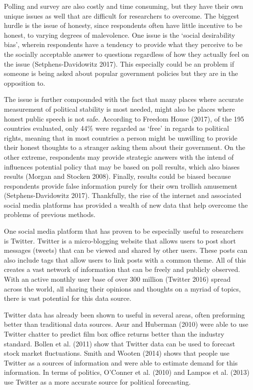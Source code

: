 \documentclass[12pt]{article}
\begin{document}
\begin{spacing}{1.5}
Polling and survey are also costly and time consuming, but they have their own unique issues as well that are difficult for researchers to overcome. The biggest hurdle is the issue of honesty, since respondents often have little incentive to be honest, to varying degrees of malevolence. One issue is the `social desirability bias', wherein respondents have a tendency to provide what they perceive to be the socially acceptable answer to questions regardless of how they actually feel on the issue (Setphens-Davidowitz 2017). This especially could be an problem if someone is being asked about popular government policies but they are in the opposition to. 

The issue is further compounded with the fact that many places where accurate measurement of political stability is most needed, might also be places where honest public speech is not safe. According to Freedom House (2017), of the 195 countries evaluated, only 44\% were regarded as `free' in regards to political rights, meaning that in most countries a person might be unwilling to provide their honest thoughts to a stranger asking them about their government. On the other extreme, respondents may provide strategic answers with the intend of influences potential policy that may be based on poll results, which also biases results (Morgan and Stocken 2008). Finally, results could be biased because respondents provide false information purely for their own trollish amusement (Setphens-Davidowitz 2017). Thankfully, the rise of the internet and associated social media platforms has provided a wealth of new data that help overcome the problems of previous methods. 

One social media platform that has proven to be especially useful to researchers is Twitter. Twitter is a micro-blogging website that allows users to post short messages (tweets) that can be viewed and shared by other users. These posts can also include tags that allow users to link posts with a common theme. All of this creates a vast network of information that can be freely and publicly observed. With an active monthly user base of over 300 million (Twitter 2016) spread across the world, all sharing their opinions and thoughts on a myriad of topics, there is vast potential for this data source. 

Twitter data has already been shown to useful in several areas, often preforming better than traditional data sources. Asur and Huberman (2010) were able to use Twitter chatter to predict film box office returns better than the industry standard. Bollen et al. (2011) show that Twitter data can be used to forecast stock market fluctuations. Smith and Wooten (2014) shows that people use Twitter as a sources of information and were able to estimate demand for this information. In terms of politics, O'Conner et al. (2010) and Lampos et al. (2013) use Twitter as a more accurate source for political forecasting. 


\end{spacing}
\end{document}
